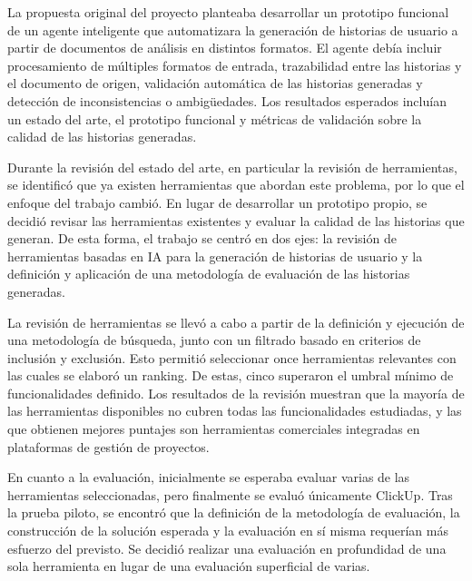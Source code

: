 
La propuesta original del proyecto planteaba desarrollar un prototipo funcional de un agente inteligente que automatizara la generación de historias de usuario a partir de documentos de análisis en distintos formatos. El agente debía incluir procesamiento de múltiples formatos de entrada, trazabilidad entre las historias y el documento de origen, validación automática de las historias generadas y detección de inconsistencias o ambigüedades. Los resultados esperados incluían un estado del arte, el prototipo funcional y métricas de validación sobre la calidad de las historias generadas.

Durante la revisión del estado del arte, en particular la revisión de herramientas, se identificó que ya existen herramientas que abordan este problema, por lo que el enfoque del trabajo cambió. En lugar de desarrollar un prototipo propio, se decidió revisar las herramientas existentes y evaluar la calidad de las historias que generan. De esta forma, el trabajo se centró en dos ejes: la revisión de herramientas basadas en IA para la generación de historias de usuario y la definición y aplicación de una metodología de evaluación de las historias generadas.

La revisión de herramientas se llevó a cabo a partir de la definición y ejecución de una metodología de búsqueda, junto con un filtrado basado en criterios de inclusión y exclusión. Esto permitió seleccionar once herramientas relevantes con las cuales se elaboró un ranking. De estas, cinco superaron el umbral mínimo de funcionalidades definido. Los resultados de la revisión muestran que la mayoría de las herramientas disponibles no cubren todas las funcionalidades estudiadas, y las que obtienen mejores puntajes son herramientas comerciales integradas en plataformas de gestión de proyectos.

En cuanto a la evaluación, inicialmente se esperaba evaluar varias de las herramientas seleccionadas, pero finalmente se evaluó únicamente ClickUp. Tras la prueba piloto, se encontró que la definición de la metodología de evaluación, la construcción de la solución esperada y la evaluación en sí misma requerían más esfuerzo del previsto. Se decidió realizar una evaluación en profundidad de una sola herramienta en lugar de una evaluación superficial de varias.

